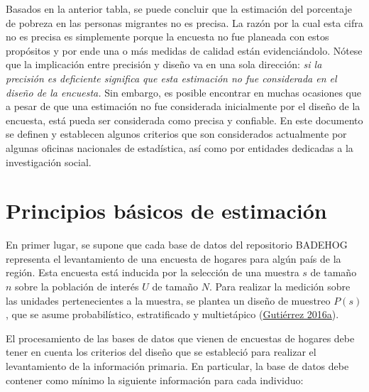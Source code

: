 \documentclass[
  12pt,
  spanish,
]{book}
\begin{document}
Basados en la anterior tabla, se puede concluir que la estimación del porcentaje de pobreza en las personas migrantes no es precisa. La razón por la cual esta cifra no es precisa es simplemente porque la encuesta no fue planeada con estos propósitos y por ende una o más medidas de calidad están evidenciándolo. Nótese que la implicación entre precisión y diseño va en una sola dirección: \emph{si la precisión es deficiente significa que esta estimación no fue considerada en el diseño de la encuesta.} Sin embargo, es posible encontrar en muchas ocasiones que a pesar de que una estimación no fue considerada inicialmente por el diseño de la encuesta, está pueda ser considerada como precisa y confiable. En este documento se definen y establecen algunos criterios que son considerados actualmente por algunas oficinas nacionales de estadística, así como por entidades dedicadas a la investigación social.

\hypertarget{principios-buxe1sicos-de-estimaciuxf3n}{%
\section{Principios básicos de estimación}\label{principios-buxe1sicos-de-estimaciuxf3n}}

En primer lugar, se supone que cada base de datos del repositorio BADEHOG representa el levantamiento de una encuesta de hogares para algún país de la región. Esta encuesta está inducida por la selección de una muestra \(s\) de tamaño \(n\) sobre la población de interés \(U\) de tamaño \(N\). Para realizar la medición sobre las unidades pertenecientes a la muestra, se plantea un diseño de muestreo \(P(s)\), que se asume probabilístico, estratificado y multietápico (\protect\hyperlink{ref-Gutierrez_2016}{Gutiérrez 2016a}).

El procesamiento de las bases de datos que vienen de encuestas de hogares debe tener en cuenta los criterios del diseño que se estableció para realizar el levantamiento de la información primaria. En particular, la base de datos debe contener como mínimo la siguiente información para cada individuo:
\end{document}
